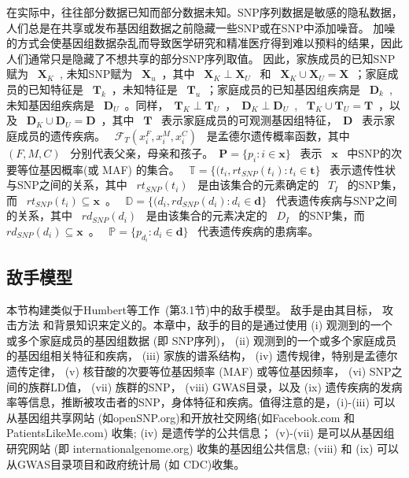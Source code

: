 在实际中，往往部分数据已知而部分数据未知。SNP序列数据是敏感的隐私数据，人们总是在共享或发布基因组数据之前隐藏一些SNP或在SNP中添加噪音。 加噪的方式会使基因组数据杂乱而导致医学研究和精准医疗得到难以预料的结果，因此人们通常只是隐藏了不想共享的部分SNP序列取值。 因此，家族成员的已知SNP赋为 ~$\mathbf{X}_K$~, 未知SNP赋为 ~$\mathbf{X}_u$~，其中 ~$\mathbf{X}_K \perp\mathbf{X}_U$~ 和 ~$\mathbf{X}_K \cup \mathbf{X}_U = \mathbf{X}$~；家庭成员的已知特征是 ~$\mathbf{T}_k$~，未知特征是 ~$\mathbf{T}_u$~；家庭成员的已知基因组疾病是 ~$\mathbf{D}_k$~, 未知基因组疾病是 ~$\mathbf{D}_U$~。同样，~$\mathbf{T}_K \perp \mathbf{T}_U$~，~$\mathbf{D}_K \perp \mathbf{D}_U$~, ~$\mathbf{T}_K \cup \mathbf{T}_U = \mathbf{T}$~，以及 ~$\mathbf{D}_K \cup \mathbf{D}_U = \mathbf{D}$~，其中 ~$\mathbf{T}$~ 表示家庭成员的可观测基因组特征，~$\mathbf{D}$~ 表示家庭成员的遗传疾病。 ~$\mathcal{F}_T(x_i^F,x_i^M,x_i^C)$~ 是孟德尔遗传概率函数，其中 ~$(F,M,C)$~ 分别代表父亲，母亲和孩子。~$\mathbf{P}=\{p_i: i \in \mathbf{x}\}$~ 表示 ~$\mathbf{x}$~ 中SNP的次要等位基因概率(或 MAF) 的集合。 ~$\mathbb{T}=\{(t_i,rt_{SNP}(t_i): t_i \in \mathbf{t}\}$~ 表示遗传性状与SNP之间的关系，其中 ~$rt_{SNP}(t_i)$~ 是由该集合的元素确定的 ~$T_I$~ 的SNP集，而 ~$rt_{SNP}(t_i) \subseteq \mathbf{x}$~。 ~$\mathbb{D}=\{(d_i,rd_{SNP}(d_i): d_i \in \mathbf{d}\}$~ 代表遗传疾病与SNP之间的关系，其中 ~$rd_{SNP}(d_i)$~ 是由该集合的元素决定的 ~$D_I$~ 的SNP集，而 ~$rd_{SNP}(d_i) \subseteq \mathbf{x}$~。 ~$\mathbb{P}=\{p_{d_i}: d_i \in \mathbf{d}\}$~ 代表遗传疾病的患病率。

\subsection{敌手模型}

本节构建类似于Humbert等工作~\cite{humbert2013addressing}(第3.1节)中的敌手模型。 敌手是由其目标， 攻击方法 和背景知识来定义的。本章中，敌手的目的是通过使用 (i) 观测到的一个或多个家庭成员的基因组数据 (即 SNP序列)，  (ii) 观测到的一个或多个家庭成员的基因组相关特征和疾病， (iii) 家族的谱系结构， (iv) 遗传规律，特别是孟德尔遗传定律， (v) 核苷酸的次要等位基因频率 (MAF) 或等位基因频率， (vi) SNP之间的族群LD值， (vii) 族群的SNP， (viii) GWAS目录，以及 (ix) 遗传疾病的发病率等信息，推断被攻击者的SNP，身体特征和疾病。值得注意的是，(i)-(iii) 可以从基因组共享网站 (如openSNP.org)和开放社交网络(如Facebook.com 和 PatientsLikeMe.com) 收集; (iv) 是遗传学的公共信息； (v)-(vii) 是可以从基因组研究网站 (即 internationalgenome.org) 收集的基因组公共信息; (viii) 和 (ix) 可以从GWAS目录项目和政府统计局 (如 CDC)收集。


